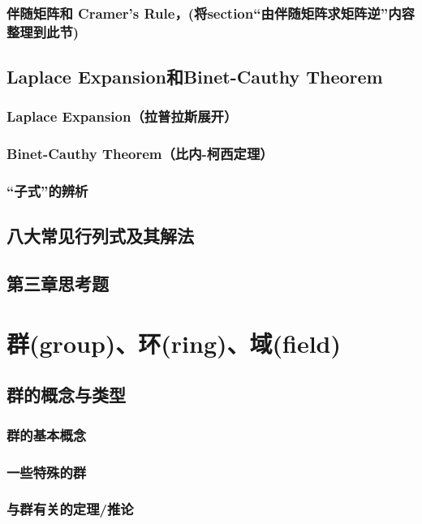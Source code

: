\documentclass[zihao=-4,UTF8]{report}
\begin{document}
\subsection{伴随矩阵和 Cramer's Rule，(将section“由伴随矩阵求矩阵逆”内容整理到此节)}
            
\section{Laplace Expansion和Binet-Cauthy Theorem}
\subsection{Laplace Expansion（拉普拉斯展开）}
\subsection{Binet-Cauthy Theorem（比内-柯西定理）}
\subsection{“子式”的辨析}

\section{八大常见行列式及其解法}

\section{第三章思考题}

\chapter{群(group)、环(ring)、域(field)}
\thispagestyle{fancy} 
\section{群的概念与类型}
\subsection{群的基本概念}
\subsection{一些特殊的群}
\subsection{与群有关的定理/推论}
\end{document}
